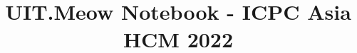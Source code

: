 \documentclass[8pt]{article}
\title{\vspace{-4ex}\Large{UIT.Meow Notebook - ICPC Asia HCM 2022}}
\author{}
\date{}
\begin{document}
\begin{landscape}

\pagebreak
\begin{multicols}{2}
\maketitle
\vspace{-13ex}
\tableofcontents
\pagestyle{fancy}

\end{multicols}
\pagebreak

\begin{multicols}{2}

\end{multicols}


\begin{multicols}{2}

\end{multicols}

\pagebreak


% 

% 

\end{landscape}
\end{document}
